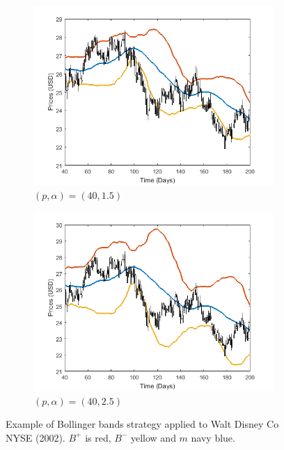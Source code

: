\documentclass[11pt,a4,twosided,singlespacing,titlepagenumber=on]{scrreprt}
\numberwithin{equation}{chapter} %
\theoremstyle{remark}
\begin{document}
\begin{figure}[H]
\begin{subfigure}[t]{0.49\textwidth}
        \includegraphics[width=1\textwidth]{bollinger/3}
        \caption{$(p, \alpha) = (40,1.5)$}
        \label{bollinger3}
    \end{subfigure}
    \begin{subfigure}[t]{0.49\textwidth}
        \centering
        \includegraphics[width=1\textwidth]{bollinger/4}
        \caption{$(p, \alpha) = (40,2.5)$}
        \label{bollinger4}
    \end{subfigure}
    \caption{Example of Bollinger bands strategy applied to Walt Disney Co NYSE (2002). $B^+$ is red, $B^-$ yellow and $m$ navy blue.}
    \label{bollinger_bands_intro}
\end{figure}
\end{document}
